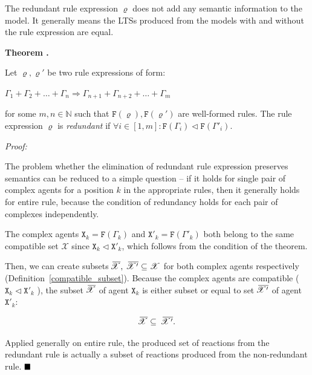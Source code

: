\documentclass[12pt]{fithesis2}
\newcounter{counter}[section]
\renewcommand{\thecounter}{\thesection.\arabic{counter}}
\newenvironment{proof}{\noindent\emph{Proof:~ }\nopagebreak \begin{itshape}}{\end{itshape}\bigskip}
\newenvironment{theorem}{\bigskip\refstepcounter{counter}\noindent\textbf{Theorem \thecounter }\nopagebreak \begin{itshape}}{\end{itshape}\medskip}
\newcommand*{\QEDA}{\hfill\ensuremath{\blacksquare}}%
\begin{document}
The redundant rule expression $\varrho$ does not add any semantic information to the model. It generally means the LTSs produced from the models with and without the rule expression are equal.

\begin{theorem}
\label{redundant_if}
Let $\varrho, \varrho'$ be two rule expressions of form:
\begin{center}
$ \Gamma_1 + \Gamma_2 + \ldots + \Gamma_n \Rightarrow \Gamma_{n+1} + \Gamma_{n+2} + \ldots + \Gamma_{m} $
\end{center}

for some $m,n \in \mathbb{N}$ such that $\mathtt{F}(\varrho), \mathtt{F}(\varrho')$ are well-formed rules. The rule expression $\varrho$ is \emph{redundant} if $ \forall i \in [ 1, m ]: \mathtt{F}(\Gamma_i) \lhd \mathtt{F}(\Gamma'_i). $
\end{theorem}

\begin{proof}
The problem whether the elimination of redundant rule expression preserves semantics can be reduced to a simple question -- if it holds for single pair of complex agents for a position $k$ in the appropriate rules, then it generally holds for entire rule, because the condition of redundancy holds for each pair of complexes independently.

The complex agents $\mathtt{X}_k = \mathtt{F}(\Gamma_k)$ and $\mathtt{X}'_k = \mathtt{F}(\Gamma'_k)$ both belong to the same compatible set $\mathscr{X}$ since $\mathtt{X}_k \lhd \mathtt{X}'_k$, which follows from the condition of the theorem. 

Then, we can create subsets $\mkern2mu\overline{\mkern-4.5mu \mathscr{X}},~ \mkern2mu\overline{\mkern-4.5mu \mathscr{X}'} \subseteq \mathscr{X}$ for both complex agents respectively (Definition~\ref{compatible_subset}). Because the complex agents are compatible ($\mathtt{X}_k \lhd \mathtt{X}'_k$ ), the subset $\mkern2mu\overline{\mkern-4.5mu \mathscr{X}}$ of agent $\mathtt{X}_k$ is either subset or equal to set $\mkern2mu\overline{\mkern-4.5mu \mathscr{X}'}$ of agent $\mathtt{X}'_k$:

$$\mkern2mu\overline{\mkern-4.5mu \mathscr{X}} \subseteq ~\mkern2mu\overline{\mkern-4.5mu \mathscr{X}'}.$$

Applied generally on entire rule, the produced set of reactions from the redundant rule is actually a subset of reactions produced from the non-redundant rule. $\QEDA$
\end{proof}
\end{document}
